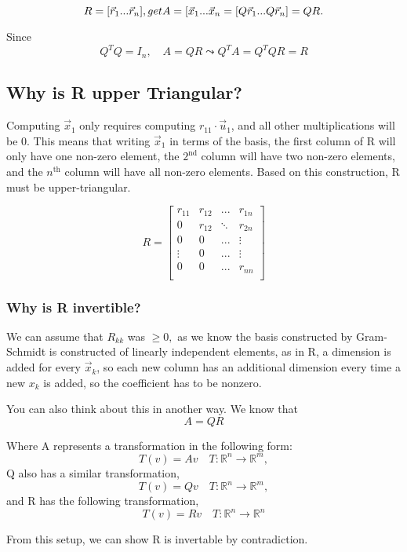 \documentclass{article}
\begin{document}
$$R = [\vec{r}_{1} ... \vec{r}_{n}] {, get} A = [\vec{x}_{1} ... \vec{x}_{n} = [Q \vec{r}_{1} ... Q \vec{r}_{n}] = QR.\newline
$$

Since $$
Q^{T}Q = I_{n}, \quad A=QR \leadsto Q^{T}A=Q^{T}QR = R$$

\subsection{Why is R upper Triangular?}
Computing $\vec{x}_1$ only requires computing $r_{11} \cdot \vec{u}_{1}$, and all other multiplications will be 0. This means that writing $\vec{x}_{1}$ in terms of the basis, the first column of R will only have one non-zero element, the $2^{\text{nd}}$ column will have two non-zero elements, and the  $n^{\text{th}}$ column will have all non-zero elements. Based on this construction, R must be upper-triangular.

$$
R=\left
[\begin{array}{cccc}
r_{11} & r_{12} & ... & r_{1n} \\
0 & r_{12} & \ddots & r_{2n} \\
0 & 0 & ... & \vdots \\
\vdots & 0 & ... & \vdots \\
0 & 0 & ... & r_{nn} \\
\end{array}\right] 
$$

\subsubsection{Why is R invertible?}
We can assume that $R_{kk}$ was $\ge 0,$ as we know the basis constructed by Gram-Schmidt is constructed of linearly independent elements, as in R, a dimension is added for every $\vec{x}_k$, so each new column has an additional dimension every time a new $x_{k}$ is added, so the coefficient has to be nonzero.

You can also think about this in another way. We know that 
$$
A=QR
$$

Where A represents a transformation in the following form:
$$
T(v)=Av \quad T:\mathbb{R}^{n} \rightarrow \mathbb{R}^{m},
$$
Q also has a similar transformation, 
$$
T(v)=Qv \quad T:\mathbb{R}^{n} \rightarrow \mathbb{R}^{m},
$$
and R has the following transformation,
$$
T(v)=Rv \quad T:\mathbb{R}^{n} \rightarrow \mathbb{R}^{n}
$$

From this setup, we can show R is invertable by contradiction.
\end{document}
